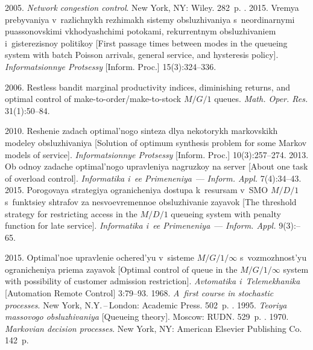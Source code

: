   \begin{multicols}{2}

\renewcommand{\bibname}{\protect\rmfamily References}

{\small\frenchspacing
 {%
 \begin{thebibliography}{99}

 2005. \textit{Network congestion control}. New York, NY: 
Wiley. 282~p.
. 2015. Vremya prebyvaniya 
v~razlichnykh rezhimakh sistemy obsluzhivaniya s~neordinarnymi 
puassonovskimi vkhodyashchimi potokami, rekurrentnym obsluzhivaniem 
i~gisterezisnoy politikoy [First passage times between modes in the queueing 
system with batch Poisson arrivals, general service, and hysteresis policy]. 
\textit{Informatsionnye Protsessy} [Inform. Proc.]  15(3):324--336.

 2006. Restless bandit marginal productivity indices, 
diminishing returns, and optimal control of make-to-order/make-to-stock $M/G/1$ 
queues. \textit{Math. Oper. Res.} 31(1):50--84.

 2010. Reshenie zadach optimal'nogo sinteza dlya 
nekotorykh markovskikh modeley obsluzhivaniya [Solution of optimum synthesis 
problem for some Markov models of service]. \textit{Informatsionnye Protsessy} 
[Inform. Proc.] 10(3):257--274.
 2013. Ob odnoy zadache optimal'nogo upravleniya 
nagruzkoy na server [About one task of overload control]. \textit{Informatika i~ee 
Primeneniya}~--- \textit{Inform. Appl.} 7(4):34--43.
 2015. Porogovaya strategiya ogra\-ni\-che\-niya dostupa 
k~resursam v~SMO $M/D/1$ s~funk\-tsi\-ey shtrafov za nesvoevremennoe 
obsluzhivanie zayavok [The threshold strategy for restricting access in the 
$M/D/1$ queueing system with penalty function for late service]. 
\textit{Informatika i~ee Primeneniya}~--- \textit{Inform. Appl.} 9(3):--65.

 2015. Optimal'noe upravlenie ochered'yu v~sisteme 
$M/G/1/\infty$ s~vozmozhnost'yu ogranicheniya priema zayavok [Optimal control 
of queue in the $M/G/1/\infty$ system with possibility of customer admission 
restriction]. \textit{Avtomatika i~Telemekhanika} [Automation Remote 
Control] 3:79--93.
 1968. \textit{A~first course in stochastic processes}. New York, 
N.Y.\,--\,London: Academic Press. 502~p.
. 1995. \textit{Teoriya massovogo 
obsluzhivaniya} [Queueing theory]. Moscow: RUDN. 529~p.
. 1970. \textit{Markovian decision processes}. New 
York, NY: American Elsevier Publishing Co. 142~p.
  \end{thebibliography}

 }
 }

\end{multicols}

